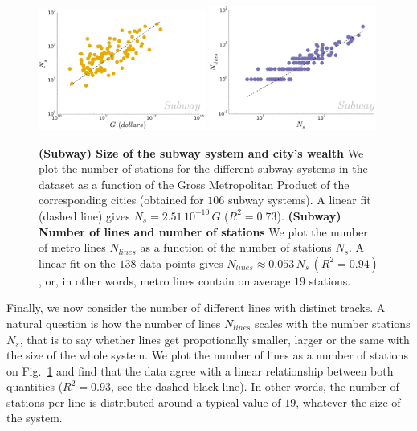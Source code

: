 \begin{figure}
\centering
    \includegraphics[width=0.49\textwidth]{gfx/chapter-networks/metro_stations_gdp.pdf}
    \includegraphics[width=0.49\textwidth]{gfx/chapter-networks/metro_lines_stations.pdf}
    \caption{{\bf (Subway) Size of the subway system and city's wealth} We plot
    the number of stations for the different subway systems in the dataset as a
function of the Gross Metropolitan Product of the corresponding cities (obtained
for $106$ subway systems). A linear fit (dashed line) gives $N_s = 2.51\,
10^{-10}\,G$ ($R^2=0.73$). {\bf (Subway) Number of lines and number of stations}
We plot the number of metro lines $N_{lines}$ as a function of the number of
stations $N_s$. A linear fit on the $138$ data points gives $N_{lines} \approx
0.053\,N_s\,(R^2=0.94)$, or, in other words, metro lines contain on average $19$
stations.} 
\label{fig:metro_stations_gdp} 
\end{figure}

Finally, we now consider the number of different lines with distinct tracks. A
natural question is how the number of lines $N_{lines}$ scales with the number
stations $N_s$, that is to say whether lines get propotionally smaller, larger
or the same with the size of the whole system. We plot the number of lines as a
number of stations on Fig.~\ref{fig:metro_stations_gdp} and find that the data
agree with a linear relationship between both quantities ($R^2=0.93$, see the
dashed black line). In other words, the number of stations per line is
distributed around a typical value of $19$, whatever the size of the system.


